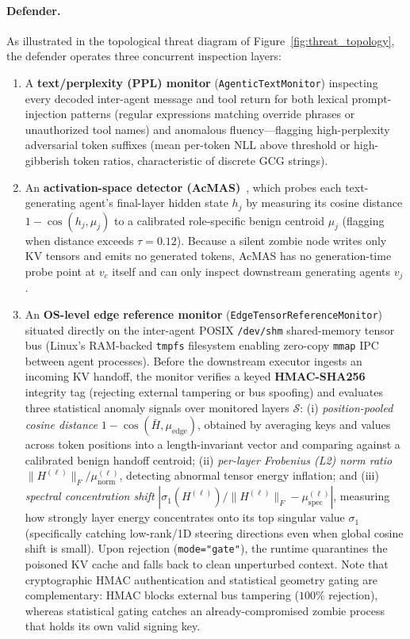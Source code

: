 \documentclass{article}
\begin{document}
\paragraph{Defender.}
As illustrated in the topological threat diagram of Figure~\ref{fig:threat_topology},
the defender operates three concurrent inspection layers:
\begin{enumerate}
  \item A \textbf{text/perplexity (PPL) monitor} (\texttt{AgenticTextMonitor})
  inspecting every decoded inter-agent message and tool return for both lexical
  prompt-injection patterns (regular expressions matching override phrases or
  unauthorized tool names) and anomalous fluency---flagging high-perplexity
  adversarial token suffixes (mean per-token NLL above threshold or
  high-gibberish token ratios, characteristic of discrete GCG strings).
  \item An \textbf{activation-space detector (AcMAS)}~\citep{acmas}, which
  probes each text-generating agent's final-layer hidden state $h_j$ by
  measuring its cosine distance $1-\cos(h_j,\mu_j)$ to a calibrated
  role-specific benign centroid $\mu_j$ (flagging when distance exceeds
  $\tau=0.12$). Because a silent zombie node writes only KV tensors and emits
  no generated tokens, AcMAS has no generation-time probe point at $v_c$ itself
  and can only inspect downstream generating agents $v_j$.
  \item An \textbf{OS-level edge reference monitor} (\texttt{EdgeTensorReferenceMonitor})
  situated directly on the inter-agent POSIX \texttt{/dev/shm} shared-memory
  tensor bus (Linux's RAM-backed \texttt{tmpfs} filesystem enabling zero-copy
  \texttt{mmap} IPC between agent processes). Before the downstream executor
  ingests an incoming KV handoff, the monitor verifies a keyed
  \textbf{HMAC-SHA256} integrity tag (rejecting external tampering or bus
  spoofing) and evaluates three statistical anomaly signals over monitored
  layers $\mathcal{S}$: (i) \emph{position-pooled cosine distance}
  $1-\cos(\bar H, \mu_{\text{edge}})$, obtained by averaging keys and values
  across token positions into a length-invariant vector and comparing against a
  calibrated benign handoff centroid; (ii) \emph{per-layer Frobenius (L2) norm
  ratio} $\|H^{(\ell)}\|_F / \mu_{\text{norm}}^{(\ell)}$, detecting abnormal
  tensor energy inflation; and (iii) \emph{spectral concentration shift}
  $|\sigma_1(H^{(\ell)})/\|H^{(\ell)}\|_F - \mu_{\text{spec}}^{(\ell)}|$,
  measuring how strongly layer energy concentrates onto its top singular value
  $\sigma_1$ (specifically catching low-rank/1D steering directions even when
  global cosine shift is small). Upon rejection (\texttt{mode="gate"}), the
  runtime quarantines the poisoned KV cache and falls back to clean unperturbed
  context. Note that cryptographic HMAC authentication and statistical geometry
  gating are complementary: HMAC blocks external bus tampering ($100\%$
  rejection), whereas statistical gating catches an already-compromised zombie
  process that holds its own valid signing key.
\end{enumerate}
\end{document}
